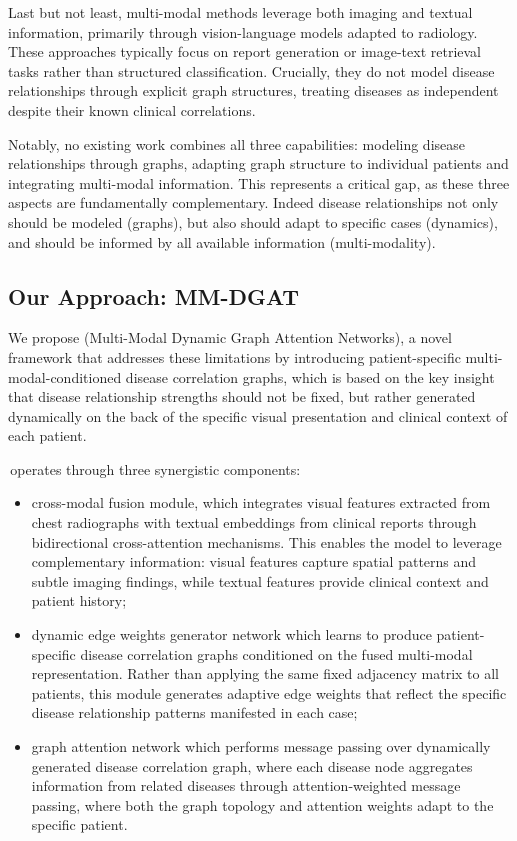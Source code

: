 \documentclass[
  journal=noname,
  manuscript=draft,
  year=,
  volume=,
]{cup-journal}
\begin{document}
Last but not least, multi-modal methods leverage both imaging and textual information, primarily through vision-language models adapted to radiology\autocite{zhang2025biomedclipmultimodalbiomedicalfoundation}. These approaches typically focus on report generation or image-text retrieval tasks rather than structured classification. Crucially, they do not model disease relationships through explicit graph structures, treating diseases as independent despite their known clinical correlations.

Notably, no existing work combines all three capabilities: modeling disease relationships through graphs, adapting graph structure to individual patients and integrating multi-modal information. This represents a critical gap, as these three aspects are fundamentally complementary. Indeed disease relationships not only should be modeled (graphs), but also should adapt to specific cases (dynamics), and should be informed by all available information (multi-modality).

\subsection{Our Approach: MM-DGAT}

We propose \textbf{\mm} (Multi-Modal Dynamic Graph Attention 
Networks), a novel framework that addresses these limitations by 
introducing patient-specific multi-modal-conditioned disease 
correlation graphs, which is based on the key insight that disease relationship 
strengths should not be fixed, but rather generated dynamically on the back of 
the specific visual presentation and clinical context of each patient.

\mm\,operates through three synergistic components:
\begin{itemize}
  \item cross-modal fusion module, which integrates visual features
extracted from chest radiographs with textual embeddings from clinical 
reports through bidirectional cross-attention mechanisms. This enables 
the model to leverage complementary information: visual features capture 
spatial patterns and subtle imaging findings, while textual features 
provide clinical context and patient history;
  \item dynamic edge weights generator network which learns to produce 
patient-specific disease correlation graphs conditioned on the fused 
multi-modal representation. Rather than applying the same fixed 
adjacency matrix to all patients, this module generates adaptive edge 
weights that reflect the specific disease relationship patterns 
manifested in each case;
\item graph attention network which performs message passing over dynamically
generated disease correlation graph, where each disease node 
aggregates information from related diseases through attention-weighted 
message passing, where both the graph topology and attention weights 
adapt to the specific patient.
\end{itemize}
\end{document}
